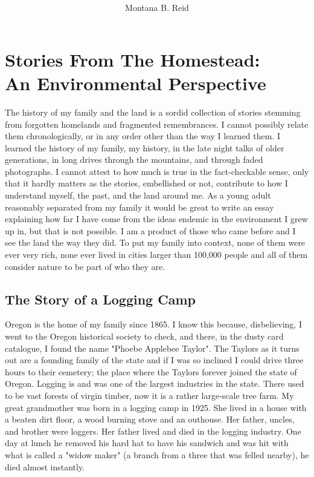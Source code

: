 \documentclass[
    a4paper,
    12pt,
    man,
    donotrepeattitle
]{apa6}
\title{\textbf{\mainheader{}}}
\author{Montana B. Reid}
\affiliation{\vspace{-12pt}Anthropology Department,\\
    \vspace{-12pt}
    American University of Central Asia\\
    \vspace{-12pt}
    \today
}
\newcommand{\mainheader}{Stories From The Homestead:\\\vspace{-12pt}An Environmental
                        Perspective}
\begin{document}

\BgThispage

\maketitle

\tableofcontents
\vspace{12pt}
\newpage

\section*{\mainheader{}}

The history of my family and the land is a sordid collection of stories
stemming from forgotten homelands and fragmented remembrances.
I cannot possibly relate them
chronologically, or in any order other than the way I learned them. I learned
the history of my family, my history, in the late night talks of older
generations, in long drives through the mountains, and through faded
photographs. I cannot attest to how much is true in the fact-checkable sense,
only that it hardly matters as the stories, embellished or not, contribute to
how I understand myself, the past, and the land around me. As a young adult
reasonably separated from my family it would be great to write an essay
explaining how far I have come from the ideas endemic in the environment I grew
up in, but that is not possible. I am a product of those who came before and
I see the land the way they did. To put my family into context, none of them 
were
ever very rich, none ever lived in cities larger than 100,000 people and all of
them consider nature to be part of who they are.

\subsection{The Story of a Logging Camp}

Oregon is the home of my family since 1865. I know this because, disbelieving,
I went to the Oregon historical society to check, and there, in the dusty card
catalogue, I found the name "Phoebe Applebee Taylor". The Taylors as it turns
out are a founding family of the state and if I was so inclined I could drive
three hours to their cemetery; the place where the Taylors forever joined the
state of Oregon. Logging is and was one of the largest industries in the state.
There used to be vast forests of virgin timber, now it is a rather large-scale
tree farm. My great grandmother was born in a logging camp in 1925. She lived
in a house with a beaten dirt floor, a wood burning stove and an outhouse. Her
father, uncles, and brother were loggers. Her father lived and died in the
logging industry. One day at lunch he removed his hard hat to have his
sandwich and was hit with what is called a "widow maker" (a branch from
a three that was felled nearby), he died almost instantly.
\end{document}
